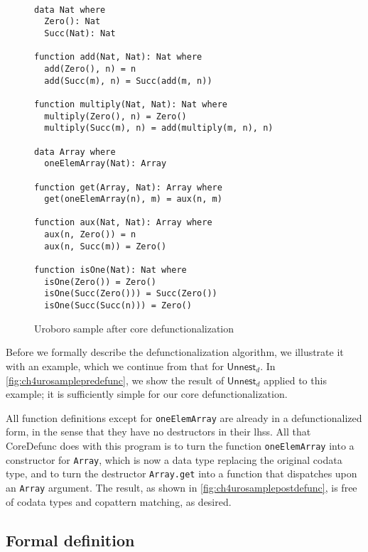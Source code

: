 \begin{figure}
\begin{lstlisting}

data Nat where
  Zero(): Nat
  Succ(Nat): Nat

function add(Nat, Nat): Nat where
  add(Zero(), n) = n
  add(Succ(m), n) = Succ(add(m, n))

function multiply(Nat, Nat): Nat where
  multiply(Zero(), n) = Zero()
  multiply(Succ(m), n) = add(multiply(m, n), n)

data Array where
  oneElemArray(Nat): Array

function get(Array, Nat): Array where
  get(oneElemArray(n), m) = aux(n, m)

function aux(Nat, Nat): Array where
  aux(n, Zero()) = n
  aux(n, Succ(m)) = Zero()

function isOne(Nat): Nat where
  isOne(Zero()) = Zero()
  isOne(Succ(Zero())) = Succ(Zero())
  isOne(Succ(Succ(n))) = Zero()

\end{lstlisting}
\caption{Uroboro sample after core defunctionalization}
\label{fig:ch4urosamplepostdefunc}
\end{figure}

Before we formally describe the defunctionalization algorithm, we illustrate it with an example, which we continue from that for $\textsf{Unnest}_d$. In \autoref{fig:ch4urosamplepredefunc}, we show the result of $\textsf{Unnest}_d$ applied to this example; it is sufficiently simple for our core defunctionalization.

All function definitions except for \texttt{oneElemArray} are already in a defunctionalized form, in the sense that they have no destructors in their lhss. All that \textsf{CoreDefunc} does with this program is to turn the function \texttt{oneElemArray} into a constructor for \texttt{Array}, which is now a data type replacing the original codata type, and to turn the destructor \texttt{Array.get} into a function that dispatches upon an \texttt{Array} argument. The result, as shown in \autoref{fig:ch4urosamplepostdefunc}, is free of codata types and copattern matching, as desired.

\subsection{Formal definition}

